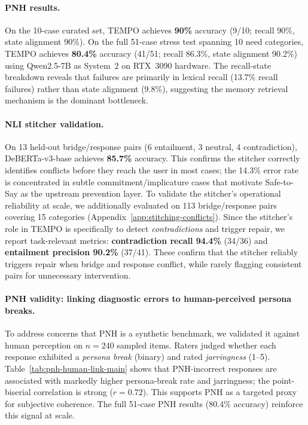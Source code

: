 \documentclass[11pt]{article}
\begin{document}
\paragraph{PNH results.}
On the 10-case curated set, TEMPO achieves \textbf{90\%} accuracy (9/10; recall 90\%, state alignment 90\%). On the full 51-case stress test spanning 10 need categories, TEMPO achieves \textbf{80.4\%} accuracy (41/51; recall 86.3\%, state alignment 90.2\%) using Qwen2.5-7B as System~2 on RTX~3090 hardware. The recall-state breakdown reveals that failures are primarily in lexical recall (13.7\% recall failures) rather than state alignment (9.8\%), suggesting the memory retrieval mechanism is the dominant bottleneck.

\paragraph{NLI stitcher validation.}
On 13 held-out bridge/response pairs (6 entailment, 3 neutral, 4 contradiction), DeBERTa-v3-base achieves \textbf{85.7\%} accuracy. This confirms the stitcher correctly identifies conflicts before they reach the user in most cases; the 14.3\% error rate is concentrated in subtle commitment/implicature cases that motivate Safe-to-Say as the upstream prevention layer.
To validate the stitcher's operational reliability at scale, we additionally evaluated on 113 bridge/response pairs covering 15 categories (Appendix~\ref{app:stitching-conflicts}). Since the stitcher's role in TEMPO is specifically to detect \emph{contradictions} and trigger repair, we report task-relevant metrics: \textbf{contradiction recall 94.4\%} (34/36) and \textbf{entailment precision 90.2\%} (37/41). These confirm that the stitcher reliably triggers repair when bridge and response conflict, while rarely flagging consistent pairs for unnecessary intervention.

\paragraph{PNH validity: linking diagnostic errors to human-perceived persona breaks.}
To address concerns that PNH is a synthetic benchmark, we validated it against human perception on $n=240$ sampled items.
Raters judged whether each response exhibited a \emph{persona break} (binary) and rated \emph{jarringness} (1--5).
Table~\ref{tab:pnh-human-link-main} shows that PNH-incorrect responses are associated with markedly higher persona-break rate and jarringness; the point-biserial correlation is strong ($r=0.72$). This supports PNH as a targeted proxy for subjective coherence. The full 51-case PNH results (80.4\% accuracy) reinforce this signal at scale.
\end{document}
